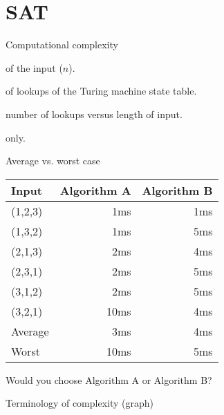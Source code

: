 \documentclass{beamer}
\begin{document}
\section{SAT}

\begin{frame}{Computational complexity}
  \begin{description}
    \setlength\itemsep{6mm}
    \item[Length] of the input ($n$).
    \item[Number] of lookups of the Turing machine state table.
    \item[Function:] number of lookups versus length of input.
    \item[Worst case] only.
  \end{description}
\end{frame}


\begin{frame}{Average vs. worst case}
  \begin{table}
    \begin{tabular}{p{2cm}rr}
      Input & Algorithm A & \hspace{1cm} Algorithm B \\
      \hline
      (1,2,3) &  1ms &  1ms \\
      (1,3,2) &  1ms &  5ms \\
      (2,1,3) &  2ms &  4ms \\
      (2,3,1) &  2ms &  5ms \\
      (3,1,2) &  2ms &  5ms \\
      (3,2,1) & 10ms &  4ms \\
      \hline
      Average &  3ms &  4ms \\
      Worst   & 10ms &  5ms
    \end{tabular}
  \end{table}
  \begin{center}
    Would you choose Algorithm A or Algorithm B?
  \end{center}
\end{frame}


\begin{frame}[fragile]{Terminology of complexity (graph)}
  \begin{center}
  \end{center}
\end{frame}
  
\end{document}
